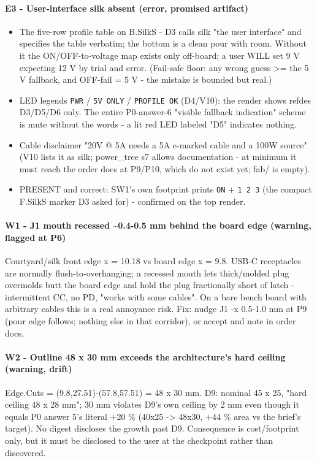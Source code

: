 \documentclass[11pt,a4paper]{article}
\begin{document}
\paragraph*{E3 - User-interface silk absent (error, promised artifact)}
\begin{itemize}
\item The five-row profile table on B.SilkS - D3 calls silk "the user interface" and
specifies the table verbatim; the bottom is a clean pour with room. Without it the
ON/OFF-to-voltage map exists only off-board; a user WILL set 9 V expecting 12 V by
trial and error. (Fail-safe floor: any wrong guess \textgreater{}= the 5 V fallback, and OFF-fail
= 5 V - the mistake is bounded but real.)
\item LED legends \texttt{PWR} / \texttt{5V ONLY} / \texttt{PROFILE OK} (D4/V10): the render shows refdes
D3/D5/D6 only. The entire P0-answer-6 "visible fallback indication" scheme is mute
without the words - a lit red LED labeled "D5" indicates nothing.
\item Cable disclaimer "20V @ 5A needs a 5A e-marked cable and a 100W source" (V10 lists
it as silk; power\_tree s7 allows documentation - at minimum it must reach the order
docs at P9/P10, which do not exist yet; fab/ is empty).
\item PRESENT and correct: SW1's own footprint prints \texttt{ON} + \texttt{1 2 3} (the compact F.SilkS
marker D3 asked for) - confirmed on the top render.
\end{itemize}
\paragraph*{W1 - J1 mouth recessed \textasciitilde{}0.4-0.5 mm behind the board edge (warning, flagged at P6)}
Courtyard/silk front edge x = 10.18 vs board edge x = 9.8. USB-C receptacles are normally flush-to-overhanging; a recessed mouth lets thick/molded plug overmolds butt the board edge and hold the plug fractionally short of latch - intermittent CC, no PD, "works with some cables". On a bare bench board with arbitrary cables this is a real annoyance risk. Fix: nudge J1 -x 0.5-1.0 mm at P9 (pour edge follows; nothing else in that corridor), or accept and note in order docs.

\paragraph*{W2 - Outline 48 x 30 mm exceeds the architecture's hard ceiling (warning, drift)}
Edge.Cuts = (9.8,27.51)-(57.8,57.51) = 48 x 30 mm. D9: nominal 45 x 25, "hard ceiling 48 x 28 mm"; 30 mm violates D9's own ceiling by 2 mm even though it equals P0 answer 5's literal +20 \% (40x25 -\textgreater{} 48x30, +44 \% area vs the brief's target). No digest discloses the growth past D9. Consequence is cost/footprint only, but it must be disclosed to the user at the checkpoint rather than discovered.
\end{document}
